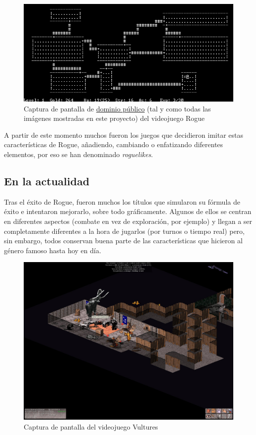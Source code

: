 \begin{figure}[h!]
		\includegraphics[width=\textwidth,height=\textheight,keepaspectratio]{./img/roguegame.PNG}
	\caption{Captura de pantalla de \href{https://en.wikipedia.org/wiki/File:Rogue_Unix_Screenshot_CAR.PNG}{dominio público} (tal y como todas las imágenes mostradas en este proyecto) del videojuego Rogue}
	\label{fig:roguegame}
\end{figure}

A partir de este momento muchos fueron los juegos que decidieron imitar estas características de Rogue, añadiendo, cambiando o enfatizando diferentes elementos, por eso se han denominado \textit{roguelikes}.

\subsection{En la actualidad}

Tras el éxito de Rogue, fueron muchos los títulos que simularon su fórmula de éxito e intentaron mejorarlo, sobre todo gráficamente. Algunos de ellos se centran en diferentes aspectos (combate en vez de exploración, por ejemplo) y llegan a ser completamente diferentes a la hora de jugarlos (por turnos o tiempo real) pero, sin embargo, todos conservan buena parte de las características que hicieron al género famoso hasta hoy en día.

\begin{figure}[h!]
		\includegraphics[width=\textwidth,height=\textheight,keepaspectratio]{./img/Vultures.jpg}
	\caption{Captura de pantalla del videojuego Vultures}
	\label{fig:vulturesgame}
\end{figure}

